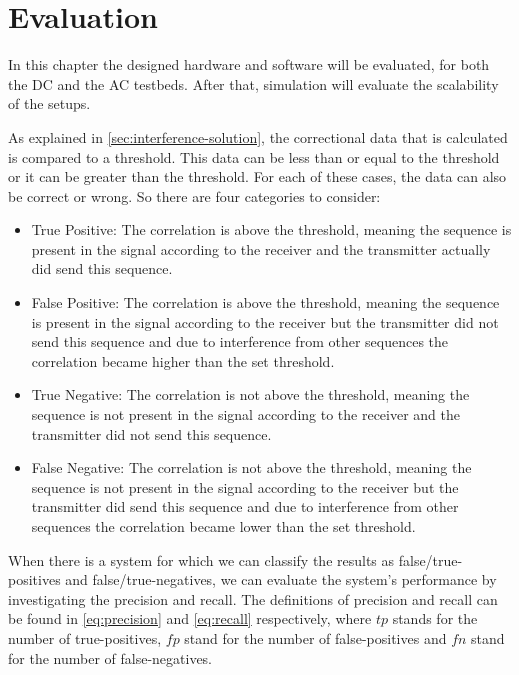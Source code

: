 
\chapter{Evaluation}
\label{chp:evaluation}


In this chapter the designed hardware and software will be evaluated, for both the DC and the AC testbeds.
After that, simulation will evaluate the scalability of the setups.


As explained in \autoref{sec:interference-solution}, the correctional data that is calculated is compared to a threshold.
This data can be less than or equal to the threshold or it can be greater than the threshold.
For each of these cases, the data can also be correct or wrong.
So there are four categories to consider:


\begin{itemize}

	\item True Positive: The correlation is above the threshold, meaning the sequence is present in the signal according to the receiver and the transmitter actually did send this sequence.

	\item False Positive: The correlation is above the threshold, meaning the sequence is present in the signal according to the receiver but the transmitter did not send this sequence and due to interference from other sequences the correlation became higher than the set threshold.

	\item True Negative: The correlation is not above the threshold, meaning the sequence is not present in the signal according to the receiver and the transmitter did not send this sequence.

	\item False Negative: The correlation is not above the threshold, meaning the sequence is not present in the signal according to the receiver but the transmitter did send this sequence and due to interference from other sequences the correlation became lower than the set threshold.


\end{itemize}




When there is a system for which we can classify the results as false/true-positives and false/true-negatives, we can evaluate the system's performance by investigating the precision and recall.
The definitions of precision and recall can be found in \autoref{eq:precision} and \autoref{eq:recall} respectively, where $tp$ stands for the number of true-positives, $fp$ stand for the number of false-positives and $fn$ stand for the number of false-negatives.

